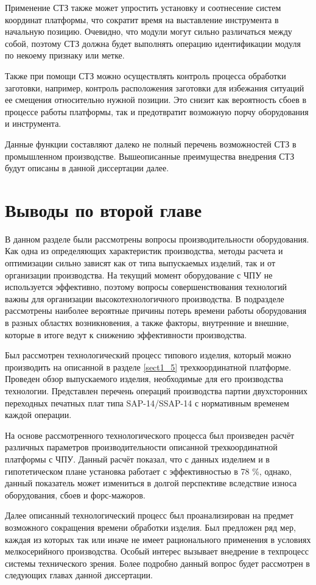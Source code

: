 Применение СТЗ также может упростить установку и соотнесение систем координат платформы, что сократит время на выставление инструмента в начальную позицию. Очевидно, что модули могут сильно различаться между собой, поэтому СТЗ должна будет выполнять операцию идентификации модуля по некоему признаку или метке. 

Также при помощи СТЗ можно осуществлять контроль процесса обработки заготовки, например, контроль расположения заготовки для избежания ситуаций ее смещения относительно нужной позиции. Это снизит как вероятность сбоев в процессе работы платформы, так и предотвратит возможную порчу оборудования и инструмента.

Данные функции составляют далеко не полный перечень возможностей СТЗ в промышленном производстве. Вышеописанные преимущества внедрения СТЗ будут описаны в данной диссертации далее.

\section{Выводы по второй главе} \label{sect2_5}

В данном разделе были рассмотрены вопросы производительности оборудования. Как одна из определяющих характеристик производства, методы расчета и оптимизации сильно зависят как от типа выпускаемых изделий, так и от организации производства. На текущий момент оборудование с ЧПУ не используется эффективно, поэтому вопросы совершенствования технологий важны для организации высокотехнологичного производства. В подразделе рассмотрены наиболее вероятные причины потерь времени работы оборудования в разных областях возникновения, а также факторы, внутренние и внешние, которые в итоге ведут к снижению эффективности производства.

Был рассмотрен технологический процесс типового изделия, который можно производить на описанной в разделе \ref{sect1_5} трехкоординатной платформе. Проведен обзор выпускаемого изделия, необходимые для его производства технологии. Представлен перечень операций производства партии двухсторонних переходных печатных плат типа SAP-14/SSAP-14 с нормативным временем каждой операции.

На основе рассмотренного технологического процесса был произведен расчёт различных параметров производительности описанной трехкоординатной платформы с ЧПУ. Данный расчёт показал, что с данных изделием и в гипотетическом плане установка работает с эффективностью в 78 \%, однако, данный показатель может измениться в долгой перспективе вследствие износа оборудования, сбоев и форс-мажоров.

Далее описанный технологический процесс был проанализирован на предмет возможного сокращения времени обработки изделия. Был предложен ряд мер, каждая из которых так или иначе не имеет рационального применения в условиях мелкосерийного производства. Особый интерес вызывает внедрение в техпроцесс системы технического зрения. Более подробно данный вопрос будет рассмотрен в следующих главах данной диссертации.